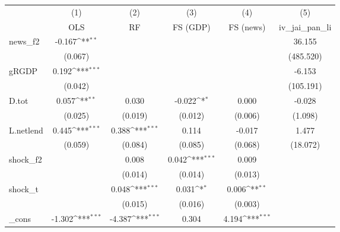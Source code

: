 {
\def\sym#1{\ifmmode^{#1}\else\(^{#1}\)\fi}
\begin{tabular}{l*{5}{c}}
\toprule
            &\multicolumn{1}{c}{(1)}&\multicolumn{1}{c}{(2)}&\multicolumn{1}{c}{(3)}&\multicolumn{1}{c}{(4)}&\multicolumn{1}{c}{(5)}\\
            &\multicolumn{1}{c}{OLS}&\multicolumn{1}{c}{RF}&\multicolumn{1}{c}{FS (GDP)}&\multicolumn{1}{c}{FS (news)}&\multicolumn{1}{c}{iv\_jai\_pan\_li}\\
\midrule
news\_f2     &      -0.167\sym{**} &                     &                     &                     &      36.155         \\
            &     (0.067)         &                     &                     &                     &   (485.520)         \\
\addlinespace
gRGDP       &       0.192\sym{***}&                     &                     &                     &      -6.153         \\
            &     (0.042)         &                     &                     &                     &   (105.191)         \\
\addlinespace
D.tot       &       0.057\sym{**} &       0.030         &      -0.022\sym{*}  &       0.000         &      -0.028         \\
            &     (0.025)         &     (0.019)         &     (0.012)         &     (0.006)         &     (1.098)         \\
\addlinespace
L.netlend   &       0.445\sym{***}&       0.388\sym{***}&       0.114         &      -0.017         &       1.477         \\
            &     (0.059)         &     (0.084)         &     (0.085)         &     (0.068)         &    (18.072)         \\
\addlinespace
shock\_f2    &                     &       0.008         &       0.042\sym{***}&       0.009         &                     \\
            &                     &     (0.014)         &     (0.014)         &     (0.013)         &                     \\
\addlinespace
shock\_t     &                     &       0.048\sym{***}&       0.031\sym{*}  &       0.006\sym{**} &                     \\
            &                     &     (0.015)         &     (0.016)         &     (0.003)         &                     \\
\addlinespace
\_cons      &      -1.302\sym{***}&      -4.387\sym{***}&       0.304         &       4.194\sym{***}&                     \\

\end{tabular}}
